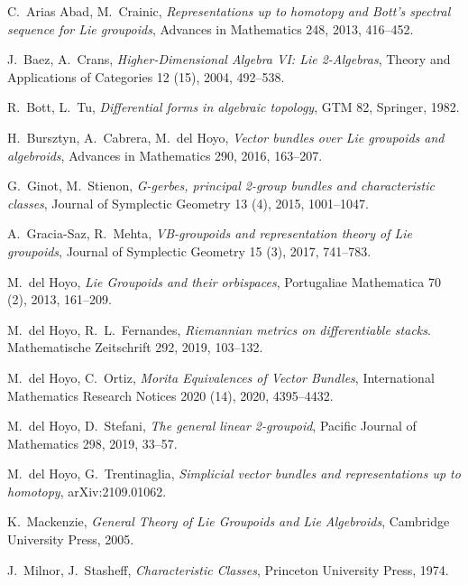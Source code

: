 \begin{thebibliography}{9}

C.~Arias Abad, M.~Crainic, \textit{Representations up to homotopy and Bott's spectral sequence for Lie groupoids}, Advances in Mathematics 248, 2013, 416--452.

J.~Baez, A.~Crans, \textit{Higher-Dimensional Algebra VI: Lie 2-Algebras}, Theory and Applications of Categories 12 (15), 2004, 492--538.

R.~Bott, L.~Tu, \textit{Differential forms in algebraic topology}, GTM 82, Springer, 1982.

H.~Bursztyn, A.~Cabrera, M.~del Hoyo, \textit{Vector bundles over Lie groupoids and algebroids}, Advances in Mathematics 290, 2016, 163--207.

G.~Ginot, M.~Stienon, \textit{G-gerbes, principal 2-group bundles and characteristic classes}, Journal of Symplectic Geometry 13 (4), 2015, 1001--1047.

A.~Gracia-Saz, R.~Mehta, \textit{VB-groupoids and representation theory of Lie groupoids}, Journal of Symplectic Geometry 15 (3), 2017, 741--783.

M.~del Hoyo, \textit{Lie Groupoids and their orbispaces}, Portugaliae Mathematica 70 (2), 2013, 161--209.

M.~del Hoyo, R.~L.~Fernandes, \textit{Riemannian metrics on differentiable stacks}. Mathematische Zeitschrift 292, 2019, 103--132.

M.~del Hoyo, C.~Ortiz, \textit{Morita Equivalences of Vector Bundles}, International Mathematics Research Notices 2020 (14), 2020, 4395--4432.

M.~del Hoyo, D.~Stefani, \textit{The general linear 2-groupoid}, Pacific Journal of Mathematics 298, 2019, 33--57.

M.~del Hoyo, G.~Trentinaglia, \textit{Simplicial vector bundles and representations up to homotopy}, arXiv:2109.01062.

K.~Mackenzie, \textit{General Theory of Lie Groupoids and Lie Algebroids}, Cambridge University Press, 2005.

J.~Milnor, J.~Stasheff, \textit{Characteristic Classes}, Princeton University Press, 1974.


\end{thebibliography}
